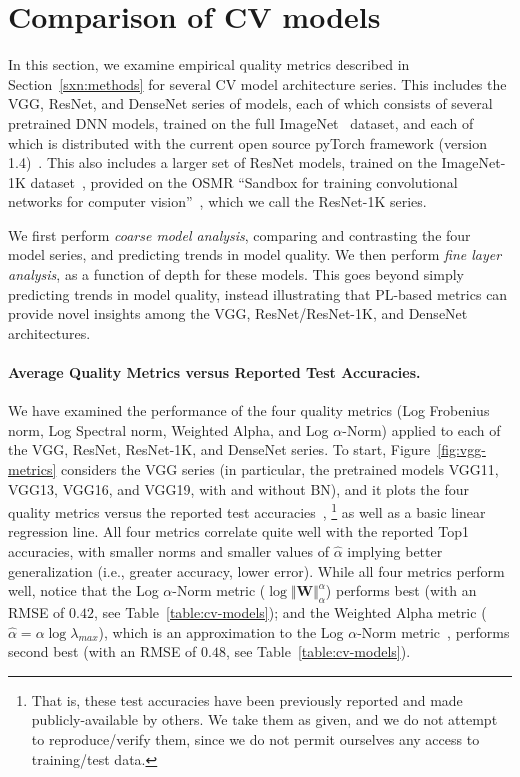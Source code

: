 \vspace{-1mm}
\section{Comparison of CV models}
\label{sxn:cv}

In this section, we examine empirical quality metrics described in Section~\ref{sxn:methods} for several CV model architecture series.
This includes the VGG, ResNet, and DenseNet series of models, each of which consists of several pretrained DNN models, trained on the full ImageNet~\cite{imagenet} dataset, and each of which is distributed with the current open source pyTorch framework (version 1.4)~\cite{pytorch}.
This also includes a larger set of ResNet models, trained on the ImageNet-1K dataset~\cite{imagenet}, provided on the OSMR ``Sandbox for training convolutional networks for computer vision''~\cite{osmr}, which we call the ResNet-1K series.

We first perform \emph{coarse model analysis}, comparing and contrasting the four model series, and predicting trends in model quality. 
We then perform \emph{fine layer analysis}, as a function of depth for these models.
This goes beyond simply predicting trends in model quality, instead illustrating that PL-based metrics can provide novel insights among the VGG, ResNet/ResNet-1K, and DenseNet architectures. 


\vspace{-1mm}
\paragraph{Average Quality Metrics versus Reported Test Accuracies.}

We have examined the performance of the four quality metrics (Log Frobenius norm, Log Spectral norm, Weighted Alpha, and Log $\alpha$-Norm) applied to each of the VGG, ResNet, ResNet-1K, and DenseNet series.
To start, Figure~\ref{fig:vgg-metrics} considers the VGG series (in particular, the pretrained models VGG11, VGG13, VGG16, and VGG19, with and without  BN), and it plots the four quality metrics versus the reported test accuracies~\cite{pytorch},%
\footnote{That is, these test accuracies have been previously reported and made publicly-available by others.  We take them as given, and we do not attempt to reproduce/verify them, since we do not permit ourselves any access to training/test data.}
as well as a basic linear regression line. 
All four metrics correlate quite well with the reported Top1 accuracies, with smaller norms and smaller values of $\hat{\alpha}$ implying better generalization (i.e., greater accuracy, lower error). 
While all four metrics perform well, notice that the Log $\alpha$-Norm metric ($\log\Vert\mathbf{W}\Vert_{\alpha}^{\alpha}$) performs best (with an RMSE of $0.42$, see Table~\ref{table:cv-models}); and the Weighted Alpha metric ($\hat\alpha =\alpha\log\lambda_{max} $), which is an approximation to the Log $\alpha$-Norm metric~\cite{MM20_unpub_work}, performs second best (with an RMSE of $0.48$, see Table~\ref{table:cv-models}).

